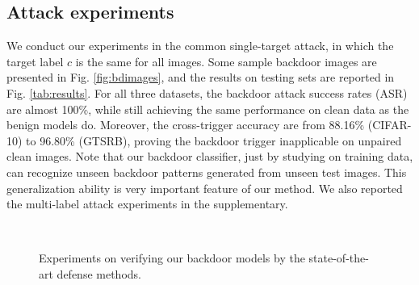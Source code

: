 \subsection{Attack experiments}
We conduct our experiments in the common single-target attack, in which the target label $c$ is the same for all images. Some sample backdoor images are presented in Fig. \ref{fig:bdimages}, and the results on testing sets are reported in Fig. \ref{tab:results}. For all three datasets, the backdoor attack success rates (ASR) are almost 100\%, while still achieving the same performance on clean data as the benign models do. Moreover, the cross-trigger accuracy are from 88.16\% (CIFAR-10) to 96.80\% (GTSRB), proving the backdoor trigger inapplicable on unpaired clean images. Note that our backdoor classifier, just by studying on training data, can recognize unseen backdoor patterns generated from unseen test images. This generalization ability is very important feature of our method. We also reported the multi-label attack experiments in the supplementary.

\begin{figure}[t]
\centering
{}
\hspace{2mm}
\\
\vskip 0.05in

    \vspace{-1.5mm}
\caption{Experiments on verifying our backdoor models by the state-of-the-art defense methods.}
\label{fig:defense}
\end{figure}

